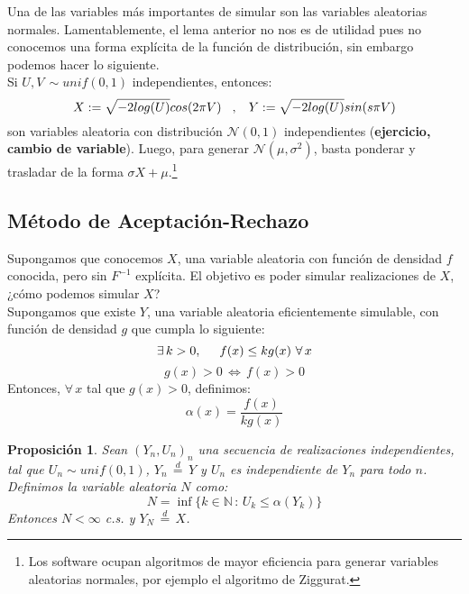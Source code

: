 \documentclass[a4paper]{article}
\newtheorem{prop}{Proposici\'on}
\numberwithin{equation}{subsection}
\numberwithin{definicion}{subsection}
\def\N{\mathbb N}
\begin{document}
Una de las variables más importantes de simular son las variables aleatorias normales. Lamentablemente, el lema anterior no nos es de utilidad pues no conocemos una forma explícita de la función de distribución, sin embargo podemos hacer lo siguiente.\\ Si $U,V\,\sim unif(0,1)$ independientes, entonces:
\[X:= \sqrt{-2log(U)}cos(2\pi V)\hspace{0.3cm},\hspace{0.3cm}Y:=\sqrt{-2log(U)}sin(s\pi V)\]
son variables aleatoria con distribución $\mathcal{N}(0,1)$ independientes (\textbf{ejercicio, cambio de variable}). Luego, para generar $\mathcal{N}(\mu,\sigma^2)$, basta ponderar y trasladar de la forma $\sigma X + \mu$.\footnote{Los software ocupan algoritmos de mayor eficiencia para generar variables aleatorias normales, por ejemplo el algoritmo de Ziggurat.}

\subsection{Método de Aceptación-Rechazo}
Supongamos que conocemos $X$, una variable aleatoria con función de densidad $f$ conocida, pero sin $F^{-1}$ explícita. El objetivo es poder simular realizaciones de $X$, ¿cómo podemos simular $X$?\\ Supongamos que existe $Y$, una variable aleatoria eficientemente simulable, con función de densidad $g$ que cumpla lo siguiente:
\[\exists\,k>0,\hspace{0.5cm}f(x)\leq kg(x)\,\,\forall\,x\]
\[g(x)>0\,\Longleftrightarrow\,f(x)>0\]
Entonces, $\forall\,x$ tal que $g(x)>0$, definimos:
\begin{equation}
    \alpha(x) = \frac{f(x)}{kg(x)}
    \label{eq.alpha de x}
\end{equation}

\begin{prop} Sean $(Y_n,U_n)_n$ una secuencia de realizaciones independientes, tal que $U_n\sim unif(0,1)$, $Y_n\,\overset{d}{=}\,Y$ y $U_n$ es independiente de $Y_n$ para todo $n$. Definimos la variable aleatoria $N$ como:
\[N=\inf\{k\in\N\,:\,U_k \leq \alpha(Y_k)\}\]
Entonces $N<\infty$ c.s. y $Y_N \,\overset{d}{=}\,X$.
\end{prop}
\end{document}
